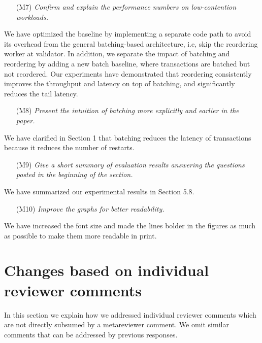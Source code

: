 \documentclass{article}
\begin{document}
\begin{itemize}
\item[(M7)] \emph{Confirm and explain the performance numbers on low-contention workloads.}
\end{itemize}
\vspace{-1em}
We have optimized the baseline by implementing a separate code path to avoid its overhead from the general batching-based architecture, i.e, skip the reordering worker at validator. In addition, we separate the impact of batching and reordering by adding a new batch baseline, where transactions are batched but not reordered. Our experiments have demonstrated that reordering consistently improves the throughput and latency on top of batching, and significantly reduces the tail latency.

\begin{itemize}
\item[(M8)] \emph{Present the intuition of batching more explicitly and earlier in the paper. }
\end{itemize}
\vspace{-1em}
We have clarified in Section 1 that batching reduces the latency of transactions because it reduces the number of restarts.

\begin{itemize}
\item[(M9)] \emph{Give a short summary of evaluation results answering the questions posted in the beginning of the section.}
\end{itemize}
\vspace{-1em}
We have summarized our experimental results in Section 5.8.

\begin{itemize}
\item[(M10)] \emph{Improve the graphs for better readability.}
\end{itemize}
\vspace{-1em}
We have increased the font size and made the lines bolder in the figures as much as possible to make them more readable in print.

\section{Changes based on individual reviewer comments}

In this section we explain how we addressed individual reviewer comments which are not directly subsumed by a metareviewer comment. We omit similar comments that can be addressed by previous responses.
\end{document}
